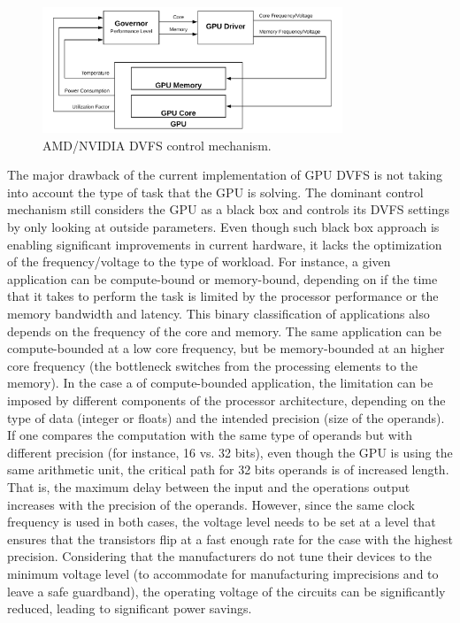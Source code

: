 \begin{figure}[!htb]
  \centering
  \includegraphics[width=0.8\textwidth]{Figures/StateArt/DVFS.png}
  \caption[Controller]{AMD/NVIDIA DVFS control mechanism.}
  \label{fig:DVFSmechanism}
\end{figure}

The major drawback of the current implementation of GPU DVFS is not taking into account the type of task that the GPU is solving. The dominant control mechanism still considers the GPU as a black box and controls its DVFS settings by only looking at outside parameters. Even though such black box approach is enabling significant improvements in current hardware, it lacks the optimization of the frequency/voltage to the type of workload. For instance, a given application can be compute-bound or memory-bound, depending on if the time that it takes to perform the task is limited by the processor performance or the memory bandwidth and latency. This binary classification of applications also depends on the frequency of the core and memory. The same application can be compute-bounded at a low core frequency, but be memory-bounded at an higher core frequency \cite{guerreiro_dvfs-aware_2019} (the bottleneck switches from the processing elements to the memory). In the case a of compute-bounded application, the limitation can be imposed by different components of the processor architecture, depending on the type of data (integer or floats) and the intended precision (size of the operands). If one compares the computation with the same type of operands but with different precision (for instance, 16 vs. 32 bits), even though the GPU is using the same arithmetic unit, the critical path for 32 bits operands is of increased length. That is, the maximum delay between the input and the operations output increases with the precision of the operands. However, since the same clock frequency is used in both cases, the voltage level needs to be set at a level that ensures that the transistors flip at a fast enough rate for the case with the highest precision. Considering that the manufacturers do not tune their devices to the minimum voltage level (to accommodate for manufacturing imprecisions and to leave a safe guardband), the operating voltage of the circuits can be significantly reduced, leading to significant power savings. 

